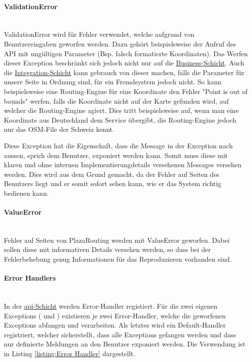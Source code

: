 \paragraph{ValidationError}\label{ehp:PR:ValidationErrorr}~\\
ValidationError wird für Fehler verwendet, welche aufgrund von Benutzereingaben geworfen werden. Dazu gehört beispielsweise der Aufruf des \ac{API} mit ungültigen Parameter (Bsp. falsch formatierte Koordinaten). Das Werfen dieser Exception beschränkt sich jedoch nicht nur auf die \hyperref[architektur:business-layer]{Business-Schicht}. Auch die \hyperref[architektur:integration-layer]{Integration-Schicht} kann gebrauch von dieser machen, falls die Parameter für unsere Seite in Ordnung sind, für ein Fremdsystem jedoch nicht. So kann beispielsweise eine Routing-Engine für eine Koordinate den Fehler "Point is out of bounds" werfen, falls die Koordinate nicht auf der Karte gefunden wird, auf welcher die Routing-Engine agiert. Dies tritt beispielsweise auf, wenn man eine Koordinate aus Deutschland dem Service übergibt, die Routing-Engine jedoch nur das \ac{OSM}-File der Schweiz kennt.

Diese Exception hat die Eigenschaft, dass die Message in der Exception nach aussen, sprich dem Benutzer, exponiert werden kann. Somit muss diese mit klaren und ohne internen Implementierungdetails versehenen Messages versehen werden. Dies wird aus dem Grund gemacht, da der Fehler auf Seiten des Benutzers liegt und er somit sofort sehen kann, wie er das System richtig bedienen kann.

\paragraph{ValueError}\label{ehp:PR:ValueError}~\\
Fehler auf Seiten von PlazaRouting werden mit ValueError geworfen. Dabei sollen diese mit informativen Details versehen werden, so dass bei der Fehlerbehebung genug Informationen für das Reproduzieren vorhanden sind.

\paragraph{Error Handlers}\label{ehp:Error Handlers}~\\
In der \hyperref[architektur:api-layer]{api-Schicht} werden Error-Handler registiert. Für die zwei eigenen Exceptions ( und ) existieren je zwei Error-Handler, welche die geworfenen Exceptions abfangen und verarbeiten. Als letztes wird ein Default-Handler registriert, welcher sicherstellt, dass alle Exceptions gefangen werden und dass nur definierte Meldungen an den Benutzer exponiert werden. Die Verwendung ist in Listing \ref{listing:Error Handler} dargestellt.

